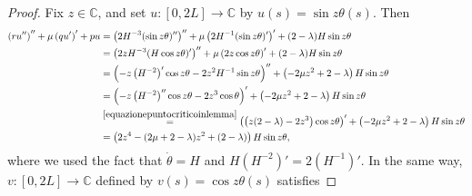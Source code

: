 \documentclass[11pt]{amsart}
\theoremstyle{definition}
\theoremstyle{remark}
\numberwithin{equation}{section}
\begin{document}
\begin{proof}
Fix $z\in\mathbb C$, and set $u:[0,2L]\to\mathbb C$ by $u(s)=\sin z\theta(s)$. Then
\begin{equation*}
\begin{split}
	\left(r  u''\right)''+ \mu\left(q  u'\right)' + pu&= \left(2 H^{-3} (\sin z\theta)''\right)''+ \mu\left(2H^{-1} (\sin z\theta)'\right)' + (2-\lambda)H\sin z\theta\\
	&=\left(2z H^{-3} (H\cos z \theta)'\right)''+ \mu\left(2 z \cos z \theta\right)' + (2-\lambda)H\sin z \theta\\
	&=\left(- z \left( H^{-2}\right)' \cos z \theta-2  z ^2H^{-1}\sin z \theta\right)''+\left(-2\mu z^2+2-\lambda\right)H\sin z\theta\\
	&=\left(-z\left( H^{-2}\right)'' \cos z\theta-2z^3\cos\theta\right)'+\left(-2\mu z^2+2-\lambda\right)H\sin z\theta\\
	&\overset{\eqref{equazionepuntocriticoinlemma}}{=} \left(\left(z(2-\lambda)-2z^3\right)\cos z\theta\right)'+\left(-2\mu z^2+2-\lambda\right)H\sin z\theta\\
	&=\left(2z^4-(2\mu+2-\lambda)z^2+(2-\lambda)\right)H\sin z\theta,\\
\end{split}
\end{equation*}
where we used the fact that $\dot\theta=H$ and $H (H^{-2})'=2(H^{-1})'$. In the same way, $v:[0,2L]\to\mathbb C$ defined by $v(s)=\cos z\theta (s)$ satisfies

\end{proof}
\end{document}
